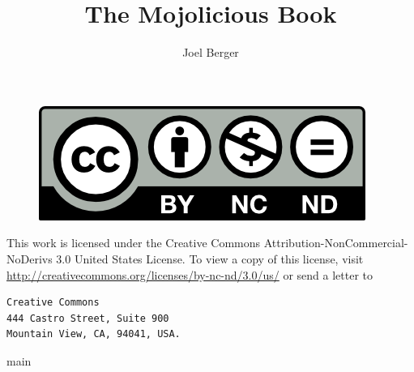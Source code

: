 \documentclass{book}
\title{The Mojolicious Book}
\author{Joel Berger}
\begin{document}
\maketitle

\newpage
\begin{figure}
  \centering
  \includegraphics{by-nc-nd}
\end{figure}
This work is licensed under the Creative Commons Attribution-NonCommercial-NoDerivs 3.0 United States License.
To view a copy of this license, visit \url{http://creativecommons.org/licenses/by-nc-nd/3.0/us/} or send a letter to
\begin{verbatim}
Creative Commons
444 Castro Street, Suite 900
Mountain View, CA, 94041, USA.
\end{verbatim}

\tableofcontents

{main}
\end{document}
